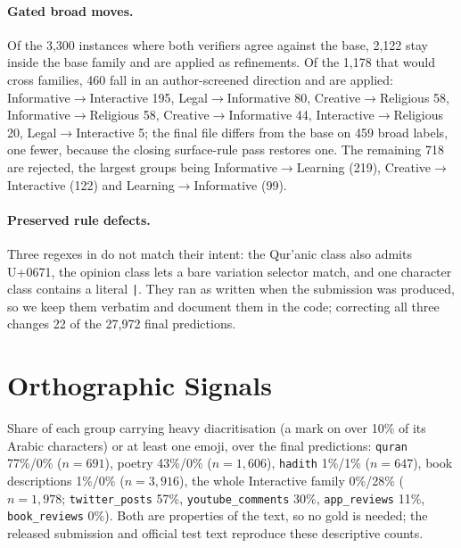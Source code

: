 \documentclass[11pt]{article}
\begin{document}
\paragraph{Gated broad moves.} Of the 3{,}300 instances where both verifiers agree against the
base, 2{,}122 stay inside the base family and are applied as refinements. Of the 1{,}178 that
would cross families, 460 fall in an author-screened direction and are applied:
Informative$\rightarrow$Interactive 195, Legal$\rightarrow$Informative 80,
Creative$\rightarrow$Religious 58, Informative$\rightarrow$Religious 58,
Creative$\rightarrow$Informative 44, Interactive$\rightarrow$Religious 20,
Legal$\rightarrow$Interactive 5; the final file differs from the base on 459 broad labels, one
fewer, because the closing surface-rule pass restores one. The remaining 718 are rejected, the largest groups being
Informative$\rightarrow$Learning (219), Creative$\rightarrow$Interactive (122) and
Learning$\rightarrow$Informative (99).

\paragraph{Preserved rule defects.} Three regexes in  do not match their
intent: the Qur'anic class also admits U+0671, the opinion class lets a bare variation selector
match, and one character class contains a literal \texttt{|}. They ran as written when the
submission was produced, so we keep them verbatim and document them in the code; correcting all
three changes 22 of the 27{,}972 final predictions.

\section{Orthographic Signals}
\label{app:ortho}
Share of each group carrying heavy diacritisation (a mark on
over 10\% of its Arabic characters) or at least one emoji, over the final predictions:
\texttt{quran} 77\%/0\% ($n{=}691$), poetry 43\%/0\% ($n{=}1{,}606$), \texttt{hadith} 1\%/1\%
($n{=}647$), book descriptions 1\%/0\% ($n{=}3{,}916$), the whole Interactive family 0\%/28\%
($n{=}1{,}978$; \texttt{twitter\_posts} 57\%, \texttt{youtube\_comments} 30\%,
\texttt{app\_reviews} 11\%, \texttt{book\_reviews} 0\%).
Both are properties of the text, so no gold is needed; the released submission and official
test text reproduce these descriptive counts.

\balance
\end{document}
